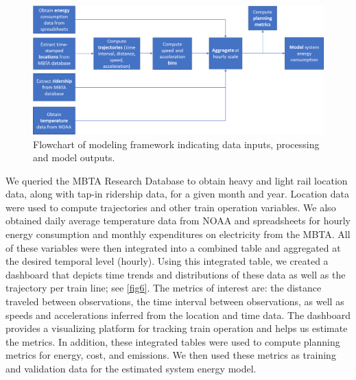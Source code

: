 \documentclass[times]{TRR}
\begin{document}
\begin{figure}[ht!]
    \centering
    \includegraphics[scale=1]{Figure_5_Framework.png}
    \caption{Flowchart of modeling framework indicating data inputs, processing and model outputs.}
    \label{fig5}
\end{figure}

We queried the MBTA Research Database to obtain heavy and light rail location data, along with tap-in ridership data, for a given month and year. Location data were used to compute trajectories and other train operation variables. We also obtained daily average temperature data from NOAA and spreadsheets for hourly energy consumption and monthly expenditures on electricity from the MBTA. All of these variables were then integrated into a combined table and aggregated at the desired temporal level (hourly). Using this integrated table, we created a dashboard that depicts time trends and distributions of these data as well as the trajectory per train line; see \autoref{fig6}.  The metrics of interest are: the distance traveled between observations, the time interval between observations, as well as speeds and accelerations inferred from the location and time data. The dashboard provides a visualizing platform for tracking train operation and helps us estimate the metrics. In addition, these integrated tables were used to compute planning metrics for energy, cost, and emissions. We then used these metrics as training and validation data for the estimated system energy model. 
\end{document}

